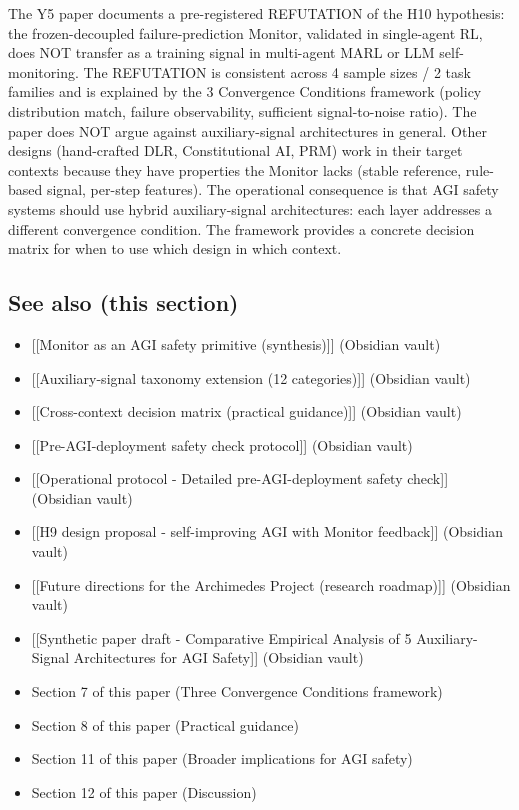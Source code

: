 \documentclass[
]{article}
\providecommand{\tightlist}{%
  \setlength{\itemsep}{0pt}\setlength{\parskip}{0pt}}
\begin{document}
The Y5 paper documents a pre-registered REFUTATION of the H10
hypothesis: the frozen-decoupled failure-prediction Monitor, validated
in single-agent RL, does NOT transfer as a training signal in
multi-agent MARL or LLM self-monitoring. The REFUTATION is consistent
across 4 sample sizes / 2 task families and is explained by the 3
Convergence Conditions framework (policy distribution match, failure
observability, sufficient signal-to-noise ratio). The paper does NOT
argue against auxiliary-signal architectures in general. Other designs
(hand-crafted DLR, Constitutional AI, PRM) work in their target contexts
because they have properties the Monitor lacks (stable reference,
rule-based signal, per-step features). The operational consequence is
that AGI safety systems should use hybrid auxiliary-signal
architectures: each layer addresses a different convergence condition.
The framework provides a concrete decision matrix for when to use which
design in which context.

\subsection{See also (this section)}\label{see-also-this-section}

\begin{itemize}
\tightlist
\item
  {[}{[}Monitor as an AGI safety primitive (synthesis){]}{]} (Obsidian
  vault)
\item
  {[}{[}Auxiliary-signal taxonomy extension (12 categories){]}{]}
  (Obsidian vault)
\item
  {[}{[}Cross-context decision matrix (practical guidance){]}{]}
  (Obsidian vault)
\item
  {[}{[}Pre-AGI-deployment safety check protocol{]}{]} (Obsidian vault)
\item
  {[}{[}Operational protocol - Detailed pre-AGI-deployment safety
  check{]}{]} (Obsidian vault)
\item
  {[}{[}H9 design proposal - self-improving AGI with Monitor
  feedback{]}{]} (Obsidian vault)
\item
  {[}{[}Future directions for the Archimedes Project (research
  roadmap){]}{]} (Obsidian vault)
\item
  {[}{[}Synthetic paper draft - Comparative Empirical Analysis of 5
  Auxiliary-Signal Architectures for AGI Safety{]}{]} (Obsidian vault)
\item
  Section 7 of this paper (Three Convergence Conditions framework)
\item
  Section 8 of this paper (Practical guidance)
\item
  Section 11 of this paper (Broader implications for AGI safety)
\item
  Section 12 of this paper (Discussion)
\end{itemize}
\end{document}
